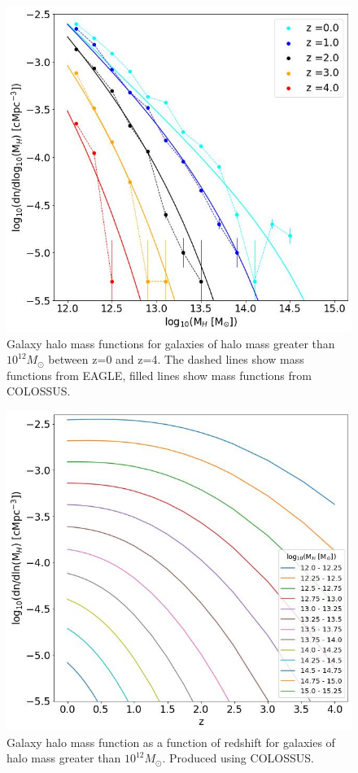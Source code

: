\documentclass[12pt, twocolumn]{revtex4}    %
\begin{document}
\onecolumngrid


\begin{figure}[H]
\centering
\includegraphics[width=\linewidth]{Mass_Function.jpeg}
\caption{Galaxy halo mass functions for galaxies of halo mass greater than $10^{12}M_\odot$ between z=0 and z=4. The dashed lines show mass functions from EAGLE, filled lines show mass functions from COLOSSUS.}
\label{fig:5}
\end{figure}
\twocolumngrid


\onecolumngrid


\begin{figure}[H]
\centering
\includegraphics[width=\linewidth]{Mass_Function_2.jpeg}
\caption{Galaxy halo mass function as a function of redshift for galaxies of halo mass greater than $10^{12}M_\odot$. Produced using COLOSSUS.}
\label{fig:6}
\end{figure}
\twocolumngrid
\end{document}
